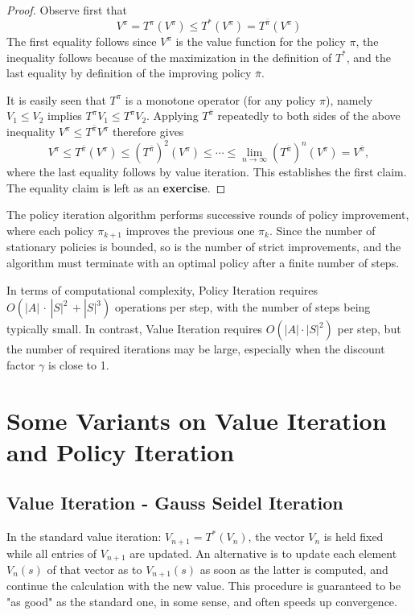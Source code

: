 \begin{proof} Observe first that
\[{V^\pi } = T_{}^\pi ({V^\pi }) \le T_{}^*({V^\pi }) = T_{}^{\bar \pi }({V^\pi })\]
The first equality follows since ${V^\pi }$ is the value function for the policy $\pi $, the inequality follows because of the maximization in the definition of  $T_{}^*$, and the last equality by definition of the improving policy $\bar \pi $.

It is easily seen that $T_{}^\pi $ is a monotone operator (for any policy $\pi $), namely ${V_1} \le {V_2}$ implies $T_{}^\pi {V_1} \le T_{}^\pi {V_2}$. Applying $T_{}^{\bar \pi }$  repeatedly to both sides of the above inequality ${V^\pi } \le T_{}^{\bar \pi }{V^\pi }$ therefore gives
\[{V^\pi } \le T_{}^{\bar \pi }({V^\pi }) \le {(T_{}^{\bar \pi })^2}({V^\pi }) \le  \cdots  \le \mathop {\lim }\limits_{n \to \infty } {(T_{}^{\bar \pi })^n}({V^\pi }) = {V^{\bar \pi }},\]
where the last equality follows by value iteration. This establishes the first claim.
The equality claim is left as an \textbf{exercise}.
\end{proof}

The policy iteration algorithm performs successive rounds of policy improvement, where each policy ${\pi _{k + 1}}$ improves the previous one ${\pi _k}$. Since the number of stationary policies is bounded, so is the number of strict improvements, and the algorithm must terminate with an optimal policy after a finite number of steps.

In terms of computational complexity, Policy Iteration requires $O(|A|\, \cdot \,|S{|^2}\, + |S{|^3})$ operations per step, with the number of steps being typically small.
 In contrast, Value Iteration requires $O(|A| \cdot |S{|^2})$ per step, but the number of required iterations may be large, especially when the discount factor $\gamma $ is close to 1.


\section{Some Variants on Value Iteration and Policy Iteration}

\subsection{Value Iteration - Gauss Seidel Iteration}
In the standard value iteration: ${V_{n + 1}} = T_{}^*({V_n})$, the vector ${V_n}$ is held fixed while all entries of ${V_{n + 1}}$ are updated.
An alternative is to update each element ${V_n}(s)$ of that vector as to ${V_{n + 1}}(s)$ as soon as the latter is computed, and continue the calculation with the new value.
This procedure is guaranteed to be "as good" as the standard one, in some sense, and often speeds up convergence.


